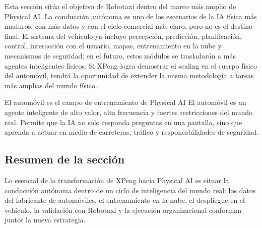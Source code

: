 Esta sección sitúa el objetivo de Robotaxi dentro del marco más amplio de Physical AI. La conducción autónoma es uno de los escenarios de la IA física más maduros, con más datos y con el ciclo comercial más claro, pero no es el destino final. El sistema del vehículo ya incluye percepción, predicción, planificación, control, interacción con el usuario, mapas, entrenamiento en la nube y mecanismos de seguridad; en el futuro, estos módulos se trasladarán a más agentes inteligentes físicos. Si XPeng logra demostrar el scaling en el cuerpo físico del automóvil, tendrá la oportunidad de extender la misma metodología a tareas más amplias del mundo físico.

\begin{importantbox}{El automóvil es el campo de entrenamiento de Physical AI}
El automóvil es un agente inteligente de alto valor, alta frecuencia y fuertes restricciones del mundo real. Permite que la IA no solo responda preguntas en una pantalla, sino que aprenda a actuar en medio de carreteras, tráfico y responsabilidades de seguridad.
\end{importantbox}

\subsection{Resumen de la sección}

Lo esencial de la transformación de XPeng hacia Physical AI es situar la conducción autónoma dentro de un ciclo de inteligencia del mundo real: los datos del fabricante de automóviles, el entrenamiento en la nube, el despliegue en el vehículo, la validación con Robotaxi y la ejecución organizacional conforman juntos la nueva estrategia.
